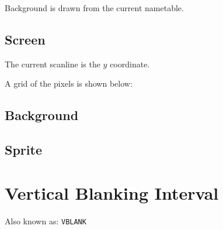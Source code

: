 Background is drawn from the current nametable.

\subsection{Screen}

The current scanline is the $y$ coordinate.

A grid of the pixels is shown below:


\subsection{Background}

\subsection{Sprite}

\section{Vertical Blanking Interval}

Also known as: \texttt{VBLANK}
